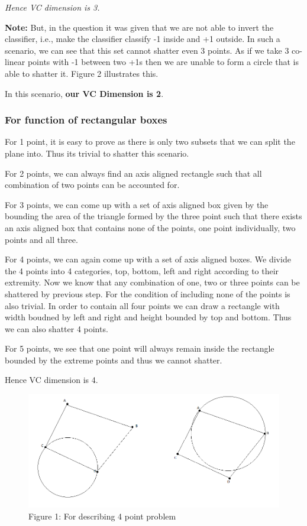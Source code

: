 \documentclass[11pt]{article}
\makeatletter
\def\maxwidth{\ifdim\Gin@nat@width>\linewidth\linewidth
    \else\Gin@nat@width\fi}
\let\Oldincludegraphics\includegraphics
\renewcommand{\includegraphics}[1]{\Oldincludegraphics[width=.8\maxwidth]{#1}}
\makeatother
\begin{document}
\emph{Hence VC dimension is 3.}

\textbf{Note:} But, in the question it was given that we are not able to invert the classifier, i.e., make the classifier classify -1 inside and +1 outside. In such a scenario, we can see that this set cannot shatter even 3 points. As if we take 3 co-linear points with -1 between two +1s then we are unable to form a circle that is able to shatter it. Figure 2 illustrates this.

In this scenario, \textbf{our VC Dimension is 2}.



\hypertarget{for-function-of-rectangular-boxes}{%
\subsubsection{For function of rectangular
boxes}\label{for-function-of-rectangular-boxes}}


For 1 point, it is easy to prove as there is only two subsets that we
can split the plane into. Thus its trivial to shatter this scenario.

For 2 points, we can always find an axis aligned rectangle such that all
combination of two points can be accounted for.

For 3 points, we can come up with a set of axis aligned box given by the
bounding the area of the triangle formed by the three point such that
there exists an axis aligned box that contains none of the points, one
point individually, two points and all three.

For 4 points, we can again come up with a set of axis aligned boxes. We
divide the 4 points into 4 categories, top, bottom, left and right
according to their extremity. Now we know that any combination of one,
two or three points can be shattered by previous step. For the condition
of including none of the points is also trivial. In order to contain all
four points we can draw a rectangle with width boudned by left and right
and height bounded by top and bottom. Thus we can also shatter 4 points.

For 5 points, we see that one point will always remain inside the
rectangle bounded by the extreme points and thus we cannot shatter.

Hence VC dimension is 4.

\clearpage

\begin{figure}
\centering
\includegraphics{Figure.png}
\caption{Figure 1: For describing 4 point problem}
\end{figure}
\end{document}
